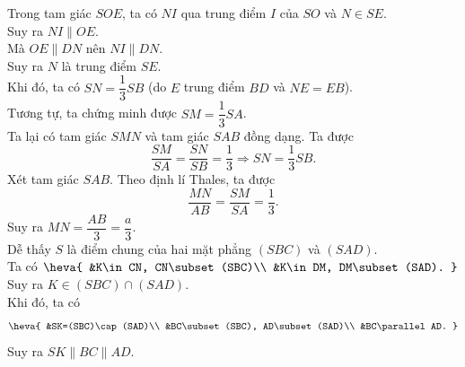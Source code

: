 \begin{ex}
{\begin{itemchoice}
			Trong tam  giác $SOE$, ta có $NI$ qua trung điểm $I$ của $SO$ và $N\in SE$.\\
			 Suy ra $NI\parallel OE$.\\
			Mà $OE\parallel DN$  nên $NI\parallel DN$.\\
			 Suy ra $N$ là trung điểm $SE$.\\
			Khi đó, ta có $SN=\dfrac{1}{3}SB$  (do $E$ trung điểm $BD$ và $NE=EB$).\\
			Tương  tự, ta chứng minh được $SM=\dfrac{1}{3}SA$.\\
			Ta lại có tam giác $SMN$ và tam  giác $SAB$ đồng dạng. Ta được \[\dfrac{SM}{SA}=\dfrac{SN}{SB}=\dfrac{1}{3}\Rightarrow SN=\dfrac{1}{3}SB.\]
			\itemch Xét tam giác $SAB$. Theo định lí Thales, ta  được
			\[\dfrac{MN}{AB}=\dfrac{SM}{SA}=\dfrac{1}{3}.\] 
			Suy ra  $MN=\dfrac{AB}{3}=\dfrac{a}{3}$.\\
			\itemch  Dễ thấy $S$ là điểm chung của hai mặt phẳng $(SBC)$ và $(SAD)$.\\
			 Ta có
			$\heva{ 
			&K\in CN,  CN\subset(SBC)\\
			&K\in DM,  DM\subset(SAD).
			 }$\\
			 Suy ra $K\in(SBC)\cap(SAD)$.\\
			 Khi đó, ta có
			\[\heva{ 
			&SK=(SBC)\cap(SAD)\\ 
			 &BC\subset(SBC), AD\subset(SAD)\\
			&BC\parallel  AD.
			 }\]
			 Suy ra $SK\parallel BC\parallel AD$.
		\end{itemchoice}
	} 
\end{ex}

